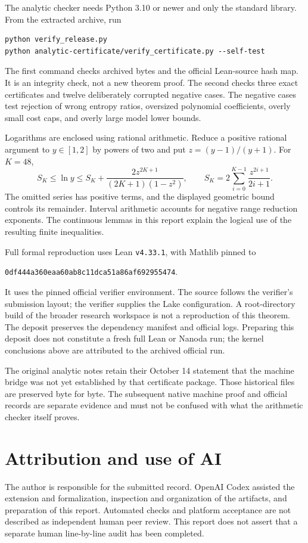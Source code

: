 \documentclass[11pt,a4paper]{article}
\newcommand{\code}[1]{\texttt{#1}}
\begin{document}
The analytic checker needs Python 3.10 or newer and only the standard
library. From the extracted archive, run
\begin{verbatim}
python verify_release.py
python analytic-certificate/verify_certificate.py --self-test
\end{verbatim}
The first command checks archived bytes and the official Lean-source hash
map. It is an integrity check, not a new theorem proof. The second checks
three exact certificates and twelve deliberately corrupted negative cases.
The negative cases test rejection of wrong entropy ratios, oversized
polynomial coefficients, overly small cost caps, and overly large
model lower bounds.

Logarithms are enclosed using rational arithmetic. Reduce a positive
rational argument to $y\in[1,2]$ by powers of two and put
$z=(y-1)/(y+1)$. For $K=48$,
\[
 S_K\le\ln y\le S_K+
 \frac{2z^{2K+1}}{(2K+1)(1-z^2)},\qquad
 S_K=2\sum_{i=0}^{K-1}\frac{z^{2i+1}}{2i+1}.
\]
The omitted series has positive terms, and the displayed geometric bound
controls its remainder. Interval arithmetic accounts for negative range
reduction exponents. The continuous lemmas in this report explain the
logical use of the resulting finite inequalities.

Full formal reproduction uses Lean \code{v4.33.1}, with Mathlib pinned to
\begin{center}\code{0df444a360eaa60ab8c11dca51a86af692955474}.\end{center}
It uses the pinned official verifier environment.
The source follows the verifier's submission layout;
the verifier supplies the Lake configuration. A root-directory build of
the broader research workspace is not a reproduction of this theorem.
The deposit preserves the dependency manifest and official logs. Preparing
this deposit does not constitute a fresh full Lean or Nanoda run; the
kernel conclusions above are attributed to the archived official run.

The original analytic notes retain their October 14 statement that the
machine bridge was not yet established by that certificate package. Those
historical files are preserved byte for byte. The subsequent native
machine proof and official records are separate evidence and must not be
confused with what the arithmetic checker itself proves.

\section{Attribution and use of AI}
The author is responsible for the submitted record. OpenAI Codex assisted
the extension and formalization, inspection and organization of the
artifacts, and preparation of this report. Automated checks and platform
acceptance are not described as independent human peer review. This report
does not assert that a separate human line-by-line audit has been completed.
\end{document}
